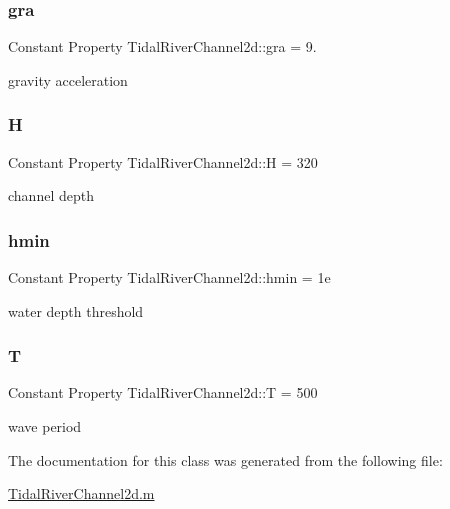 \subsubsection{\texorpdfstring{gra}{gra}}
{\footnotesize\ttfamily Constant Property Tidal\+River\+Channel2d\+::gra = 9.}



gravity acceleration 

\mbox{\label{class_tidal_river_channel2d_a06ac276d7ceb09e64cfca7468e8edeab}} 
\subsubsection{\texorpdfstring{H}{H}}
{\footnotesize\ttfamily Constant Property Tidal\+River\+Channel2d\+::H = 320}



channel depth 

\mbox{\label{class_tidal_river_channel2d_a6c05c54f21e67c8f757b5909ee36485d}} 
\subsubsection{\texorpdfstring{hmin}{hmin}}
{\footnotesize\ttfamily Constant Property Tidal\+River\+Channel2d\+::hmin = 1e}



water depth threshold 

\mbox{\label{class_tidal_river_channel2d_acfa9d9339d72192dda6ae999f6f1af1b}} 
\subsubsection{\texorpdfstring{T}{T}}
{\footnotesize\ttfamily Constant Property Tidal\+River\+Channel2d\+::T = 500}



wave period 



The documentation for this class was generated from the following file\+:\begin{DoxyCompactItemize}
\item 
\hyperlink{_tidal_river_channel2d_8m}{Tidal\+River\+Channel2d.\+m}\end{DoxyCompactItemize}
